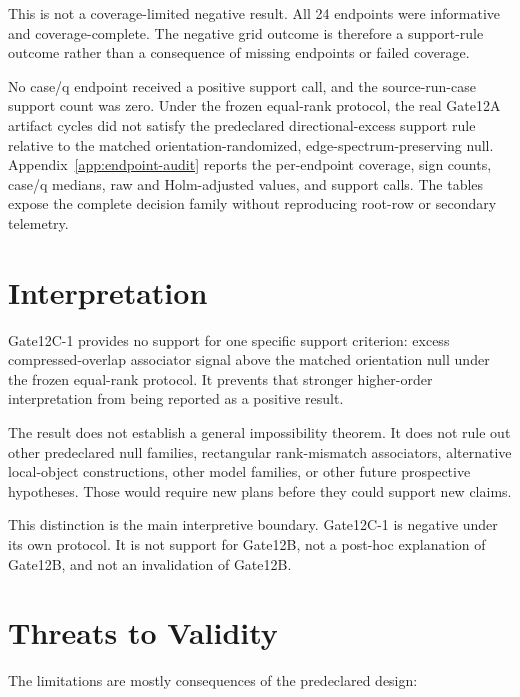 \documentclass[11pt]{article}
\begin{document}
This is not a coverage-limited negative result. All 24 endpoints were
informative and coverage-complete. The negative grid outcome is therefore a
support-rule outcome rather than a consequence of missing endpoints or failed
coverage.

No case/q endpoint received a positive support call, and the source-run-case
support count was zero. Under the frozen equal-rank protocol, the real Gate12A
artifact cycles did not satisfy the predeclared directional-excess support rule
relative to the matched orientation-randomized, edge-spectrum-preserving null.
Appendix~\ref{app:endpoint-audit} reports the per-endpoint coverage, sign
counts, case/q medians, raw and Holm-adjusted values, and support calls. The
tables expose the complete decision family without reproducing root-row or
secondary telemetry.

\section{Interpretation}
\label{sec:interpretation}

Gate12C-1 provides no support for one specific support criterion: excess
compressed-overlap associator signal above the matched orientation null under
the frozen equal-rank protocol. It prevents that stronger higher-order
interpretation from being reported as a positive result.

The result does not establish a general impossibility theorem. It does not rule
out other predeclared null families, rectangular rank-mismatch associators,
alternative local-object constructions, other model families, or other future
prospective hypotheses. Those would require new plans before they could support
new claims.

This distinction is the main interpretive boundary. Gate12C-1 is negative under
its own protocol. It is not support for Gate12B, not a post-hoc explanation of
Gate12B, and not an invalidation of Gate12B.

\section{Threats to Validity}
\label{sec:threats}

The limitations are mostly consequences of the predeclared design:
\end{document}
